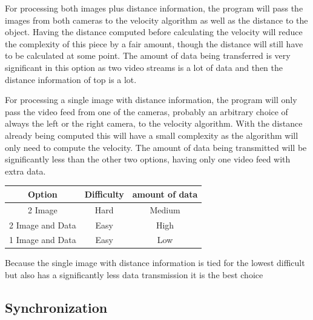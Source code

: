 \documentclass[onecolumn, draftclsnofoot,10pt, compsoc]{IEEEtran}
\begin{document}
For processing both images plus distance information, the program will pass the images from both cameras to the velocity algorithm as well as the distance to the object.
Having the distance computed before calculating the velocity will reduce the complexity of this piece by a fair amount, though the distance will still have to be calculated at some point.
The amount of data being transferred is very significant in this option as two video streams is a lot of data and then the distance information of top is a lot.

For processing a single image with distance information, the program will only pass the video feed from one of the cameras, probably an arbitrary choice of always the left or the right camera, to the velocity algorithm.
With the distance already being computed this will have a small complexity as the algorithm will only need to compute the velocity.
The amount of data being transmitted will be significantly less than the other two options, having only one video feed with extra data.


\begin{center}
	\begin{tabular}{|c|c|c|}
		\hline
		\textbf{Option} & \textbf{Difficulty} & \textbf{amount of data} \\
		\hline
		2 Image & Hard & Medium \\
		\hline
		2 Image and Data & Easy & High\\
		\hline
		1 Image and Data & Easy & Low \\
		\hline
		
	\end{tabular}
\end{center}


Because the single image with distance information is tied for the lowest difficult but also has a significantly less data transmission it is the best choice

\newpage
\subsection{Synchronization} %

\end{document}
